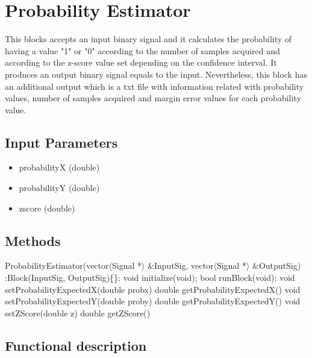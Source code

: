 \clearpage

\section{Probability Estimator}

\maketitle

This blocks accepts an input binary signal and it calculates the probability of having a value "1" \space or "0" \space according to the number of samples acquired and according to the z-score value set depending on the confidence interval. It produces an output binary signal equals to the input. Nevertheless, this block has an additional output which is a txt file with information related with probability values, number of samples acquired and margin error values for each probability value.

\subsection*{Input Parameters}

	\begin{itemize}
		\item probabilityX\linebreak
		(double)
		\item probabilityY\linebreak
		(double)
		\item zscore \linebreak
		(double)
	
	\end{itemize}

\subsection*{Methods}

ProbabilityEstimator(vector$\langle$Signal *$\rangle$ \&InputSig, vector$\langle$Signal *$\rangle$ \&OutputSig) :Block(InputSig, OutputSig)\{\};
\bigbreak	
void initialize(void);
\bigbreak	
bool runBlock(void);
\bigbreak	
void setProbabilityExpectedX(double probx)
double getProbabilityExpectedX()
\bigbreak	
void setProbabilityExpectedY(double proby)
double getProbabilityExpectedY()
\bigbreak
void setZScore(double z)
double getZScore()


\subsection*{Functional description}

